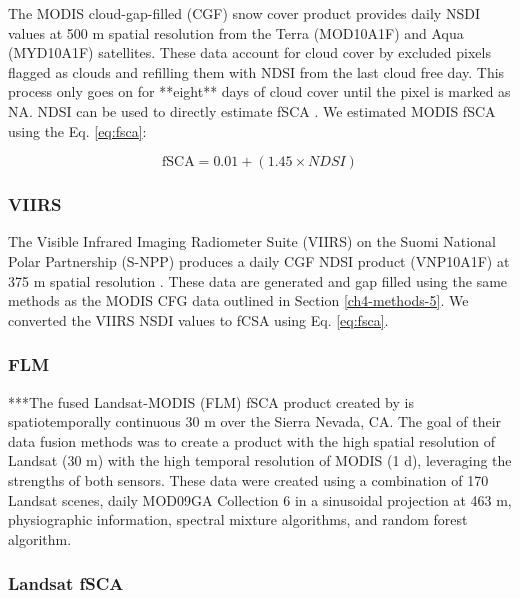 The MODIS cloud-gap-filled (CGF) snow cover product \citep{hallEvaluationMODISVIIRS2019} provides daily NSDI values at 500 m spatial resolution from the Terra (MOD10A1F) and Aqua (MYD10A1F) satellites. These data account for cloud cover by excluded pixels  flagged as clouds and refilling them with NDSI from the last cloud free day. This process only goes on for **eight** days of cloud cover until the pixel is marked as NA. NDSI can be used to directly estimate fSCA \citep{salomonsonEstimatingFractionalSnow2004, salomonsonDevelopmentAquaMODIS2006,stillingerLandsatMODISVIIRS2023}. We estimated MODIS fSCA using the Eq. \ref{eq:fsca}:

\begin{equation}
\label{eq:fsca}
\text{fSCA} = 0.01 + (1.45 \times NDSI)
\end{equation}


\hypertarget{ch4-methods-6}{\subsubsection{VIIRS}\label{ch4-methods-6}}

The Visible Infrared Imaging Radiometer Suite (VIIRS) on the Suomi National Polar Partnership (S-NPP) produces a daily CGF NDSI product (VNP10A1F) at 375 m spatial resolution \citep{hallEvaluationMODISVIIRS2019}. These data are generated and gap filled using the same methods as the MODIS CFG data outlined in Section \ref{ch4-methods-5}. We converted the VIIRS NSDI values to fCSA using Eq. \ref{eq:fsca}.


\hypertarget{ch4-methods-7}{\subsubsection{FLM}\label{ch4-methods-7}}

***The fused Landsat-MODIS (FLM) fSCA product created by \cite{rittgerMultisensorFusionUsing2021} is spatiotemporally continuous 30 m over the Sierra Nevada, CA. The goal of their data fusion methods was to create a product with the high spatial resolution of Landsat (30 m) with the high temporal resolution of MODIS (1 d), leveraging the strengths of both sensors. These data were created using a combination of 170 Landsat scenes, daily MOD09GA Collection 6 in a sinusoidal projection at 463 m, physiographic information, spectral mixture algorithms, and random forest algorithm. 

\hypertarget{ch4-methods-8}{\subsubsection{Landsat fSCA}\label{ch4-methods-8}}

